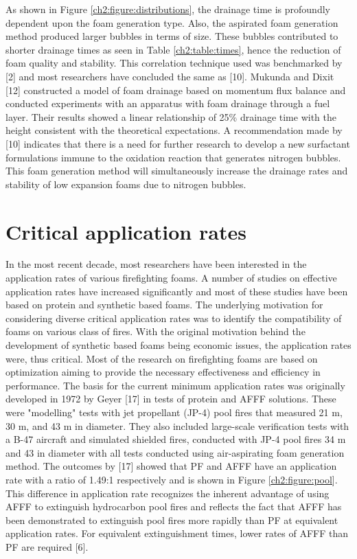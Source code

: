 \documentclass[12pt]{report}
\begin{document}
As shown in Figure \ref{ch2:figure:distributions}, the drainage time is profoundly dependent upon the foam generation type. Also, the aspirated foam generation method produced larger bubbles in terms of size. These bubbles contributed to shorter drainage times as seen in Table \ref{ch2:table:times}, hence the reduction of foam quality and stability. This correlation technique used was benchmarked by [2] and most researchers have concluded the same as [10]. Mukunda and Dixit [12] constructed a model of foam drainage based on momentum flux balance and conducted experiments with an apparatus with foam drainage through a fuel layer. Their results showed a linear relationship of 25\% drainage time with the height consistent with the theoretical expectations. A recommendation made by [10] indicates that there is a need for further research to develop a new surfactant formulations immune to the oxidation reaction that generates nitrogen bubbles. This foam generation method will simultaneously increase the drainage rates and stability of low expansion foams due to nitrogen bubbles.

\section{Critical application rates}
In the most recent decade, most researchers have been interested in the application rates of various firefighting foams. A number of studies on effective application rates have increased significantly and most of these studies have been based on protein and synthetic based foams. The underlying motivation for considering diverse critical application rates was to identify the compatibility of foams on various class of fires. With the original motivation behind the development of synthetic based foams being economic issues, the application rates were, thus critical.
Most of the research on firefighting foams are based on optimization aiming to provide the necessary effectiveness and efficiency in performance. The basis for the current minimum application rates was originally developed in 1972 by Geyer [17] in tests of protein and AFFF solutions. These were "modelling" tests with jet propellant (JP-4) pool fires that measured 21 m, 30 m, and 43 m in diameter. They also included large-scale verification tests with a B-47 aircraft and simulated shielded fires, conducted with JP-4 pool fires 34 m and 43 in diameter with all tests conducted using air-aspirating foam generation method. The outcomes by [17] showed that PF and AFFF have an application rate with a ratio of 1.49:1 respectively and is shown in Figure \ref{ch2:figure:pool}. This difference in application rate recognizes the inherent advantage of using AFFF to extinguish hydrocarbon pool fires and reflects the fact that AFFF has been demonstrated to extinguish pool fires more rapidly than PF at equivalent application rates. For equivalent extinguishment times, lower rates of AFFF than PF are required [6].
\end{document}
